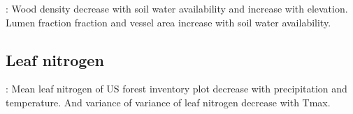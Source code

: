 \documentclass[a4paper,11pt]{article}
\begin{document}
\citet{Cornwell-2009}: Wood density decrease with soil water availability and increase with elevation. Lumen fraction fraction and vessel area increase with soil water availability.

\subsection{Leaf nitrogen}

\citet{Swenson-2010}: Mean leaf nitrogen of US forest inventory plot decrease with precipitation and temperature. And variance of variance of leaf nitrogen decrease with Tmax.


\clearpage



\end{document}
